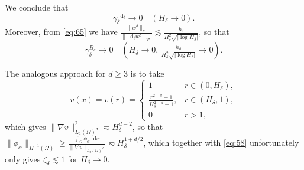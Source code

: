 \documentclass{amsart}
\numberwithin{equation}{section}
\newcommand{\1}{\mathbb 1}
\newcommand*\diff{\mathop{}\!\mathrm{d}}
\begin{document}
We conclude that 
$$
\gamma^{\diff_t}_\delta \rightarrow 0 \quad (H_\delta \rightarrow 0).
$$
Moreover, from \eqref{eq:65} we have $\frac{\|w^\delta\|_Y}{\|\diff_t w^\delta\|_{Y'}} \lesssim \frac{h_\delta}{H_\delta^2 \sqrt{|\log H_\delta|}}$, so that
$$
\gamma^{B_e}_\delta\rightarrow 0 \quad (H_\delta \rightarrow 0,\,\tfrac{h_\delta}{H_\delta^2 \sqrt{|\log H_\delta|}} \rightarrow 0).
$$

The analogous approach for $d \geq 3$ is to take 
$$
v(x)=v(r)=\left\{\begin{array}{cc} 1 & r \in (0,H_\delta),\\ \frac{r^{2-d}-1}{H_\delta^{2-d}-1}, &r \in (H_\delta,1),\\ 0 & r>1,\end{array}\right.
$$
which gives $\|\nabla v\|_{L_2(\Omega)^d}^2 \eqsim H_\delta^{d-2}$, so that $\|\phi_\alpha\|_{H^{-1}(\Omega)} \geq \frac{\int_\Omega \phi_\alpha \diff x}{\|\nabla v\|_{L_2(\Omega)^d}}\eqsim H_\delta^{1+d/2}$, which together with \eqref{eq:58} unfortunately only gives $\zeta_\delta \lesssim 1$ for $H_\delta \rightarrow 0$.
\end{document}
